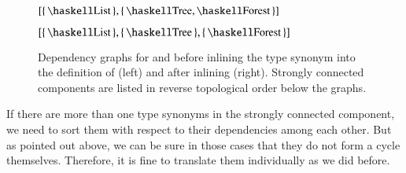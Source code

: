 \begin{figure}[H]
  \begin{center}
    \begin{minipage}[t]{0.45\textwidth}
      \begin{center}
        $[\{\, \haskellM{List} \,\}, \{\, \haskellM{Tree}, \haskellM{Forest} \,\}]$
      \end{center}
    \end{minipage}
    \begin{minipage}[t]{0.45\textwidth}
      \begin{center}
        $[\{\, \haskellM{List} \,\}, \{\, \haskellM{Tree} \,\}, \{\, \haskellM{Forest} \,\}]$
      \end{center}
    \end{minipage}
  \end{center}
  \caption{
    Dependency graphs for  and  before inlining the type synonym  into the definition of  (left) and after inlining (right).
    Strongly connected components are listed in reverse topological order below the graphs.
  }
  \label{fig:translation:type-decl:graph2}
\end{figure}

If there are more than one type synonyms in the strongly connected component, we need to sort them with respect to their dependencies among each other.
But as pointed out above, we can be sure in those cases that they do not form a cycle themselves.
Therefore, it is fine to translate them individually as we did before.
